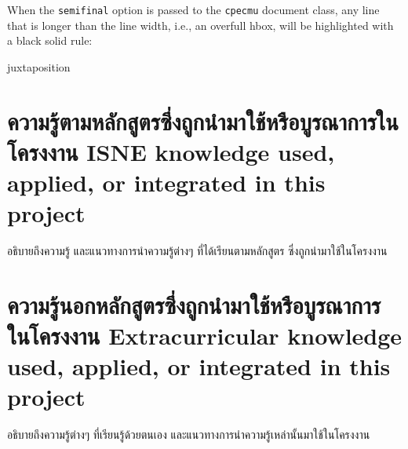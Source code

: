 When the \verb.semifinal. option is passed to the \verb.cpecmu. document class,
any line that is longer than the line width, i.e., an overfull hbox, will be
highlighted with a black solid rule:
\begin{center}
\begin{minipage}{2em}
juxtaposition
\end{minipage}
\end{center}

\section{\ifcpe%
ความรู้ตามหลักสูตรซึ่งถูกนำมาใช้หรือบูรณาการในโครงงาน
\else%
ISNE knowledge used, applied, or integrated in this project
\fi
}

อธิบายถึงความรู้ และแนวทางการนำความรู้ต่างๆ ที่ได้เรียนตามหลักสูตร ซึ่งถูกนำมาใช้ในโครงงาน

\section{\ifcpe%
ความรู้นอกหลักสูตรซึ่งถูกนำมาใช้หรือบูรณาการในโครงงาน
\else%
Extracurricular knowledge used, applied, or integrated in this project
\fi
}

อธิบายถึงความรู้ต่างๆ ที่เรียนรู้ด้วยตนเอง และแนวทางการนำความรู้เหล่านั้นมาใช้ในโครงงาน
